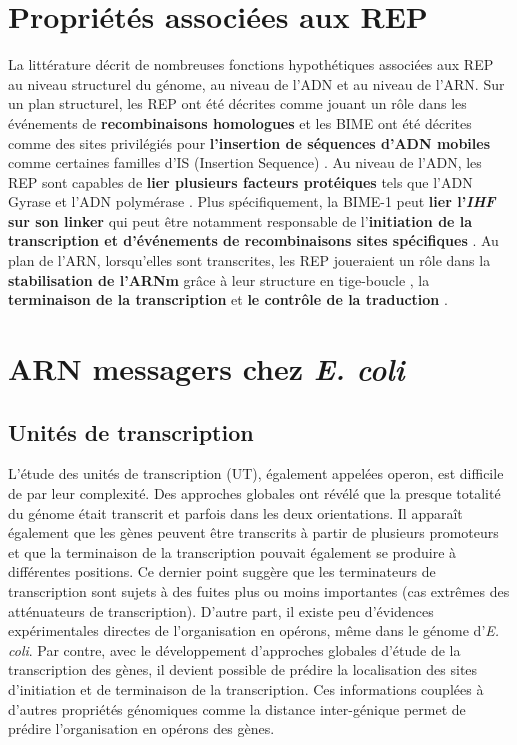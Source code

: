 \documentclass[12pt,a4paper]{report}
\begin{document}
\begin{onehalfspace}
\section*{Propriétés associées aux REP}
La littérature décrit de nombreuses fonctions hypothétiques associées aux REP au niveau structurel du génome, au niveau de l'ADN et au niveau de l'ARN. Sur un plan structurel, les REP ont été décrites comme jouant un rôle dans les événements de \textbf{recombinaisons homologues} \citep{Kofoid2003} et les BIME ont été décrites comme des sites privilégiés pour \textbf{l'insertion de séquences d'ADN mobiles} comme certaines familles d'IS (Insertion Sequence) \citep{Bachellier1997,Clement1999,Choi2003,Tobes2005}. Au niveau de l'ADN, les REP sont capables de \textbf{lier plusieurs facteurs protéiques} tels que l'ADN Gyrase \citep{Espeli1997} et l'ADN polymérase \citep{Gilson1990}. Plus spécifiquement, la BIME-1 peut \textbf{lier l'\textit{IHF} sur son linker} \citep{Boccard1993} qui peut être notamment responsable de l'\textbf{initiation de la transcription et d’événements de recombinaisons sites spécifiques} \citep{Goosen1995}. Au plan de l'ARN, lorsqu'elles sont transcrites, les REP joueraient un rôle dans la \textbf{stabilisation de l'ARNm} grâce à leur structure en tige-boucle \citep{Newbury1987,Espeli2001,Khemici2004,Aguena2009}, la \textbf{terminaison de la transcription} \citep{Gilson1986} et \textbf{le contrôle de la traduction} \citep{Stern1988}. 

\section*{ARN messagers chez \textit{E. coli}}

\subsection*{Unités de transcription}
L'étude des unités de transcription (UT), également appelées \gls{operon}, est difficile de par leur complexité. Des approches globales ont révélé que la presque totalité du génome était transcrit et parfois dans les deux orientations. Il apparaît également que les gènes peuvent être transcrits à partir de plusieurs promoteurs et que la terminaison de la transcription pouvait également se produire à différentes positions. Ce dernier point suggère que les terminateurs de transcription sont sujets à des fuites plus ou moins importantes (cas extrêmes des atténuateurs de transcription). D'autre part, il existe peu d'évidences expérimentales directes de l'organisation en opérons, même dans le génome d'\textit{E. coli}. Par contre, avec le développement d'approches globales d'étude de la transcription des gènes, il devient possible de prédire la localisation des sites d'initiation et de terminaison de la transcription. Ces informations couplées à d'autres propriétés génomiques comme la distance inter-génique permet de prédire l'organisation en opérons des gènes.


\end{onehalfspace}
\end{document}
